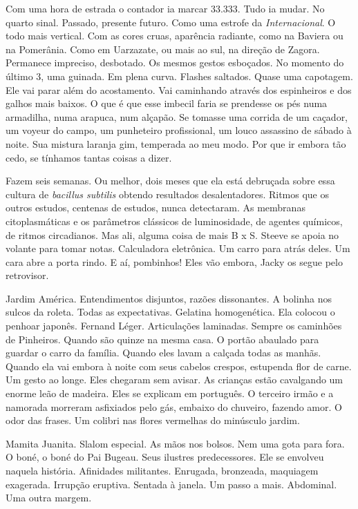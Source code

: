 Com uma hora de estrada o contador ia marcar 33.333. Tudo ia mudar. No
quarto sinal. Passado, presente futuro. Como uma estrofe da
\emph{Internacional}. O todo mais vertical. Com as cores cruas,
aparência radiante, como na Baviera ou na Pomerânia. Como em Uarzazate,
ou mais ao sul, na direção de Zagora. Permanece impreciso, desbotado. Os
mesmos gestos esboçados. No momento do último 3, uma guinada. Em plena
curva. Flashes saltados. Quase uma capotagem. Ele vai parar além do
acostamento. Vai caminhando através dos espinheiros e dos galhos mais
baixos. O que é que esse imbecil faria se prendesse os pés numa
armadilha, numa arapuca, num alçapão. Se tomasse uma corrida de um
caçador, um voyeur do campo, um punheteiro profissional, um louco
assassino de sábado à noite. Sua mistura laranja gim, temperada ao meu
modo. Por que ir embora tão cedo, se tínhamos tantas coisas a dizer.

Fazem seis semanas. Ou melhor, dois meses que ela está debruçada sobre
essa cultura de \emph{bacillus subtilis} obtendo resultados
desalentadores. Ritmos que os outros estudos, centenas de estudos, nunca
detectaram. As membranas citoplasmáticas e os parâmetros clássicos de
luminosidade, de agentes químicos, de ritmos circadianos. Mas ali,
alguma coisa de mais B x S. Steeve se apoia no volante para tomar notas.
Calculadora eletrônica. Um carro para atrás deles. Um cara abre a porta
rindo. E aí, pombinhos! Eles vão embora, Jacky os segue pelo retrovisor.

Jardim América. Entendimentos disjuntos, razões dissonantes. A bolinha
nos sulcos da roleta. Todas as expectativas. Gelatina homogenética. Ela
colocou o penhoar japonês. Fernand Léger. Articulações laminadas. Sempre
os caminhões de Pinheiros. Quando são quinze na mesma casa. O portão
abaulado para guardar o carro da família. Quando eles lavam a calçada
todas as manhãs. Quando ela vai embora à noite com seus cabelos crespos,
estupenda flor de carne. Um gesto ao longe. Eles chegaram sem avisar. As
crianças estão cavalgando um enorme leão de madeira. Eles se explicam em
português. O terceiro irmão e a namorada morreram asfixiados pelo gás,
embaixo do chuveiro, fazendo amor. O odor das frases. Um colibri nas
flores vermelhas do minúsculo jardim.

Mamita Juanita. Slalom especial. As mãos nos bolsos. Nem uma gota para
fora. O boné, o boné do Pai Bugeau. Seus ilustres predecessores. Ele se
envolveu naquela história. Afinidades militantes. Enrugada, bronzeada,
maquiagem exagerada. Irrupção eruptiva. Sentada à janela. Um passo a
mais. Abdominal. Uma outra margem.

